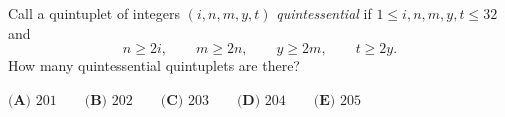 Call a quintuplet of integers $(i,n,m,y,t)$ \emph{quintessential} if $1\le i,n,m,y,t\le32$ and
\[n\ge2i,\qquad m\ge2n,\qquad y\ge2m,\qquad t\ge2y.\]
How many quintessential quintuplets are there?

$\textbf{(A) } 201 \qquad \textbf{(B) } 202 \qquad \textbf{(C) } 203 \qquad \textbf{(D) } 204 \qquad \textbf{(E) } 205$
